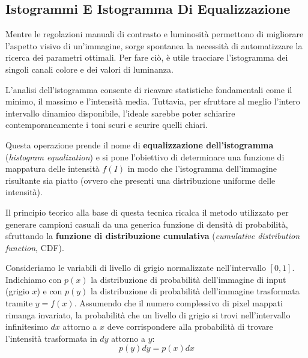 ﻿\documentclass[11pt, a4paper]{article}
\begin{document}

\subsection{Istogrammi E Istogramma Di Equalizzazione}

Mentre le regolazioni manuali di contrasto e luminosità permettono di migliorare l'aspetto visivo di un'immagine, sorge spontanea la necessità di automatizzare la ricerca dei parametri ottimali. Per fare ciò, è utile tracciare l'istogramma dei singoli canali colore e dei valori di luminanza.


L'analisi dell'istogramma consente di ricavare statistiche fondamentali come il minimo, il massimo e l'intensità media. Tuttavia, per sfruttare al meglio l'intero intervallo dinamico disponibile, l'ideale sarebbe poter schiarire contemporaneamente i toni scuri e scurire quelli chiari.

Questa operazione prende il nome di \textbf{equalizzazione dell'istogramma} (\emph{histogram equalization}) e si pone l'obiettivo di determinare una funzione di mappatura delle intensità $f(I)$ in modo che l'istogramma dell'immagine risultante sia piatto (ovvero che presenti una distribuzione uniforme delle intensità).


Il principio teorico alla base di questa tecnica ricalca il metodo utilizzato per generare campioni casuali da una generica funzione di densità di probabilità, sfruttando la \textbf{funzione di distribuzione cumulativa} (\emph{cumulative distribution function}, CDF).

Consideriamo le variabili di livello di grigio normalizzate nell'intervallo $[0,1]$. Indichiamo con $p(x)$ la distribuzione di probabilità dell'immagine di input (grigio $x$) e con $p(y)$ la distribuzione di probabilità dell'immagine trasformata tramite $y = f(x)$. Assumendo che il numero complessivo di pixel mappati rimanga invariato, la probabilità che un livello di grigio si trovi nell'intervallo infinitesimo $dx$ attorno a $x$ deve corrispondere alla probabilità di trovare l'intensità trasformata in $dy$ attorno a $y$:
\[ p(y)dy = p(x)dx \]
\end{document}
